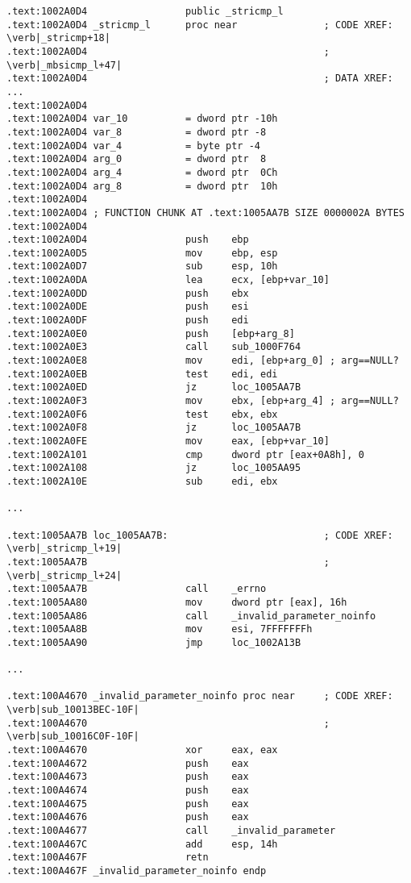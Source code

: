 \begin{lstlisting}[style=customasmx86]
.text:1002A0D4                 public _stricmp_l
.text:1002A0D4 _stricmp_l      proc near               ; CODE XREF: \verb|_stricmp+18|
.text:1002A0D4                                         ; \verb|_mbsicmp_l+47|
.text:1002A0D4                                         ; DATA XREF: ...
.text:1002A0D4
.text:1002A0D4 var_10          = dword ptr -10h
.text:1002A0D4 var_8           = dword ptr -8
.text:1002A0D4 var_4           = byte ptr -4
.text:1002A0D4 arg_0           = dword ptr  8
.text:1002A0D4 arg_4           = dword ptr  0Ch
.text:1002A0D4 arg_8           = dword ptr  10h
.text:1002A0D4
.text:1002A0D4 ; FUNCTION CHUNK AT .text:1005AA7B SIZE 0000002A BYTES
.text:1002A0D4
.text:1002A0D4                 push    ebp
.text:1002A0D5                 mov     ebp, esp
.text:1002A0D7                 sub     esp, 10h
.text:1002A0DA                 lea     ecx, [ebp+var_10]
.text:1002A0DD                 push    ebx
.text:1002A0DE                 push    esi
.text:1002A0DF                 push    edi
.text:1002A0E0                 push    [ebp+arg_8]
.text:1002A0E3                 call    sub_1000F764
.text:1002A0E8                 mov     edi, [ebp+arg_0] ; arg==NULL?
.text:1002A0EB                 test    edi, edi
.text:1002A0ED                 jz      loc_1005AA7B
.text:1002A0F3                 mov     ebx, [ebp+arg_4] ; arg==NULL?
.text:1002A0F6                 test    ebx, ebx
.text:1002A0F8                 jz      loc_1005AA7B
.text:1002A0FE                 mov     eax, [ebp+var_10]
.text:1002A101                 cmp     dword ptr [eax+0A8h], 0
.text:1002A108                 jz      loc_1005AA95
.text:1002A10E                 sub     edi, ebx

...

.text:1005AA7B loc_1005AA7B:                           ; CODE XREF: \verb|_stricmp_l+19|
.text:1005AA7B                                         ; \verb|_stricmp_l+24|
.text:1005AA7B                 call    _errno
.text:1005AA80                 mov     dword ptr [eax], 16h
.text:1005AA86                 call    _invalid_parameter_noinfo
.text:1005AA8B                 mov     esi, 7FFFFFFFh
.text:1005AA90                 jmp     loc_1002A13B

...

.text:100A4670 _invalid_parameter_noinfo proc near     ; CODE XREF: \verb|sub_10013BEC-10F|
.text:100A4670                                         ; \verb|sub_10016C0F-10F|
.text:100A4670                 xor     eax, eax
.text:100A4672                 push    eax
.text:100A4673                 push    eax
.text:100A4674                 push    eax
.text:100A4675                 push    eax
.text:100A4676                 push    eax
.text:100A4677                 call    _invalid_parameter
.text:100A467C                 add     esp, 14h
.text:100A467F                 retn
.text:100A467F _invalid_parameter_noinfo endp


\end{lstlisting}
